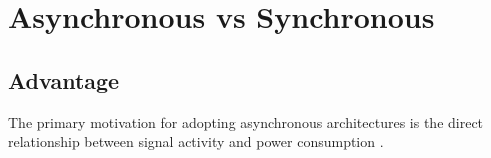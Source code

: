 



\section{Asynchronous vs Synchronous}
\label{sec:async_vs_sync}

\subsection{Advantage}
The primary motivation for adopting asynchronous architectures is the direct relationship between signal activity and power consumption \cite{lim_2013}.


